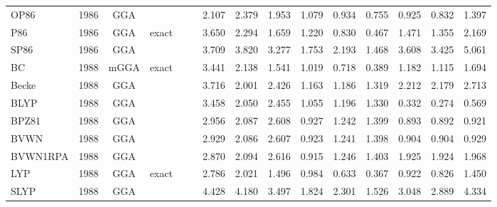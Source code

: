 \begin{landscape}
\begin{longtable}{lcccccrrrrrrrrr}
    OP86             & 1986 & GGA  &          &             &           & 2.107             & 2.379             & 1.953  & 1.079              & 0.934             & 0.755  & 0.925   & 0.832 & 1.397 \\
    P86              & 1986 & GGA  & exact    &             &           & 3.650             & 2.294             & 1.659  & 1.220              & 0.830             & 0.467  & 1.471   & 1.355 & 2.169 \\
    SP86             & 1986 & GGA  &          &             &           & 3.709             & 3.820             & 3.277  & 1.753              & 2.193             & 1.468  & 3.608   & 3.425 & 5.061 \\
    BC               & 1988 & mGGA & exact    &             &           & 3.441             & 2.138             & 1.541  & 1.019              & 0.718             & 0.389  & 1.182   & 1.115 & 1.694 \\
    Becke            & 1988 & GGA  &          &             &           & 3.716             & 2.001             & 2.426  & 1.163              & 1.186             & 1.319  & 2.212   & 2.179 & 2.713 \\
    BLYP             & 1988 & GGA  &          &             &           & 3.458             & 2.050             & 2.455  & 1.055              & 1.196             & 1.330  & 0.332   & 0.274 & 0.569 \\
    BPZ81            & 1988 & GGA  &          &             &           & 2.956             & 2.087             & 2.608  & 0.927              & 1.242             & 1.399  & 0.893   & 0.892 & 0.921 \\
    BVWN             & 1988 & GGA  &          &             &           & 2.929             & 2.086             & 2.607  & 0.923              & 1.241             & 1.398  & 0.904   & 0.904 & 0.929 \\
    BVWN1RPA         & 1988 & GGA  &          &             &           & 2.870             & 2.094             & 2.616  & 0.915              & 1.246             & 1.403  & 1.925   & 1.924 & 1.968 \\
    LYP              & 1988 & GGA  & exact    &             &           & 2.786             & 2.021             & 1.496  & 0.984              & 0.633             & 0.367  & 0.922   & 0.826 & 1.450 \\
    SLYP             & 1988 & GGA  &          &             &           & 4.428             & 4.180             & 3.497  & 1.824              & 2.301             & 1.526  & 3.048   & 2.889 & 4.334 \\

\end{longtable}
\end{landscape}
